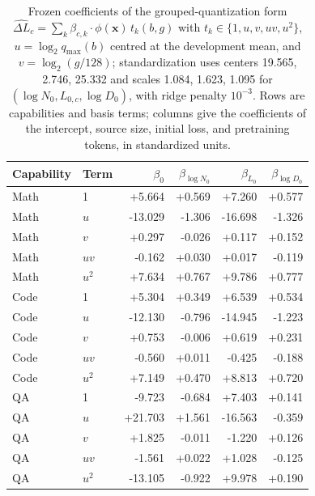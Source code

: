 \begin{table}[!htbp]\normalfont\centering\footnotesize
\begin{tabular*}{\textwidth}{@{\extracolsep{\fill}}llrrrr@{}}
\toprule
Capability & Term & $\beta_{0}$ & $\beta_{\log N_0}$ & $\beta_{L_0}$ & $\beta_{\log D_0}$ \\
\midrule
Math & 1 & +5.664 & +0.569 & +7.260 & +0.577 \\
Math & $u$ & -13.029 & -1.306 & -16.698 & -1.326 \\
Math & $v$ & +0.297 & -0.026 & +0.117 & +0.152 \\
Math & $uv$ & -0.162 & +0.030 & +0.017 & -0.119 \\
Math & $u^2$ & +7.634 & +0.767 & +9.786 & +0.777 \\
\midrule
Code & 1 & +5.304 & +0.349 & +6.539 & +0.534 \\
Code & $u$ & -12.130 & -0.796 & -14.945 & -1.223 \\
Code & $v$ & +0.753 & -0.006 & +0.619 & +0.231 \\
Code & $uv$ & -0.560 & +0.011 & -0.425 & -0.188 \\
Code & $u^2$ & +7.149 & +0.470 & +8.813 & +0.720 \\
\midrule
QA & 1 & -9.723 & -0.684 & +7.403 & +0.141 \\
QA & $u$ & +21.703 & +1.561 & -16.563 & -0.359 \\
QA & $v$ & +1.825 & -0.011 & -1.220 & +0.126 \\
QA & $uv$ & -1.561 & +0.022 & +1.028 & -0.125 \\
QA & $u^2$ & -13.105 & -0.922 & +9.978 & +0.190 \\
\bottomrule\end{tabular*}
\caption{Frozen coefficients of the grouped-quantization form $\widehat{\Delta L}_c=\sum_k \beta_{c,k}\cdot\phi(\mathbf x)\,t_k(b,g)$ with $t_k\in\{1,u,v,uv,u^2\}$, $u=\log_2 q_{\max}(b)$ centred at the development mean, and $v=\log_2(g/128)$; standardization uses centers 19.565, 2.746, 25.332 and scales 1.084, 1.623, 1.095 for $(\log N_0, L_{0,c}, \log D_0)$, with ridge penalty $10^{-3}$. Rows are capabilities and basis terms; columns give the coefficients of the intercept, source size, initial loss, and pretraining tokens, in standardized units.}
\label{tab:quant2d_coef}\end{table}
